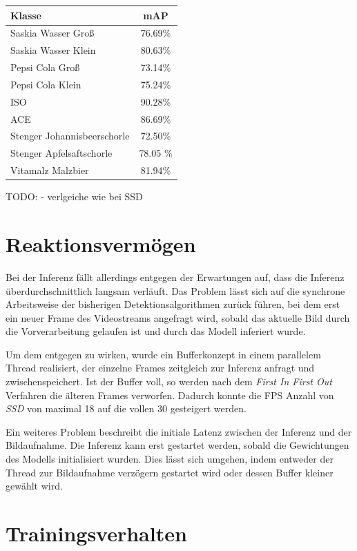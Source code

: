 \begin{center}
	\begin{tabular}[h]{l|c}
		Klasse & mAP \\
		\hline
		Saskia Wasser Groß & 76.69\% \\
		Saskia Wasser Klein & 80.63\% \\
		Pepsi Cola Groß & 73.14\% \\
		Pepsi Cola Klein & 75.24\% \\
		ISO & 90.28\% \\
		ACE & 86.69\% \\
		Stenger Johannisbeerschorle & 72.50\% \\
		Stenger Apfelsaftschorle & 78.05 \% \\
		Vitamalz Malzbier & 81.94\%
	\end{tabular}
	\label{table:yoloresults}
\end{center}

TODO:
 - verlgeiche wie bei SSD
 
 
\section{Reaktionsvermögen}

Bei der Inferenz fällt allerdings entgegen der Erwartungen auf, dass die Inferenz überdurchschnittlich langsam verläuft. Das Problem lässt sich auf die synchrone Arbeitsweise der bisherigen Detektionsalgorithmen zurück führen, bei dem erst ein neuer Frame des Videostreams angefragt wird, sobald das aktuelle Bild durch die Vorverarbeitung gelaufen ist und durch das Modell inferiert wurde. 

Um dem entgegen zu wirken, wurde ein Bufferkonzept in einem parallelem Thread realisiert, der einzelne Frames zeitgleich zur Inferenz anfragt und zwischenspeichert. Ist der Buffer voll, so werden nach dem \textit{First In First Out} Verfahren die älteren Frames verworfen. Dadurch konnte die FPS Anzahl von \textit{SSD} von maximal 18 auf die vollen 30 gesteigert werden. 

Ein weiteres Problem beschreibt die initiale Latenz zwischen der Inferenz und der Bildaufnahme. Die Inferenz kann erst gestartet werden, sobald die Gewichtungen des Modells initialisiert wurden. Dies lässt sich umgehen, indem entweder der Thread zur Bildaufnahme verzögern gestartet wird oder dessen Buffer kleiner gewählt wird.

\section{Trainingsverhalten}


